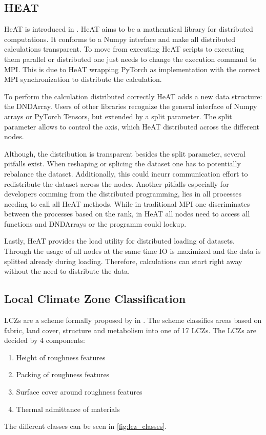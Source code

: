 \subsection{HEAT}
\label{subsec:heat}
\gls{HeAT} is introduced in \cite{krajsek_helmholtz_nodate}. HeAT aims to be a mathemtical library for distributed computations.
It conforms to a Numpy \cite{noauthor_numpy_nodate} interface and make all distributed calculations transparent. To move from executing \gls{HeAT} scripts to executing them parallel
or distributed one just needs to change the execution command to MPI.
This is due to \gls{HeAT} wrapping PyTorch as implementation with the correct \gls{MPI} synchronization to distribute the calculation.

To perform the calculation distributed correctly \gls{HeAT} adds a new data structure: the DNDArray. Users of other libraries
recognize the general interface of Numpy arrays or PyTorch Tensors, but extended by a split parameter.
The split parameter allows to control the axis, which \gls{HeAT} distributed across the different nodes.

Although, the distribution is transparent besides the split parameter, several pitfalls exist.
When reshaping or splicing the dataset one has to potentially rebalance the dataset. Additionally, this could incurr communication effort
to redistribute the dataset across the nodes.
Another pitfalls especially for developers comming from the distributed programming, lies in all processes needing to call all \gls{HeAT} methods.
While in traditional \gls{MPI} one discriminates between the processes based on the rank, in \gls{HeAT} all nodes need to access all functions and DNDArrays or the
programm could lockup.

Lastly, \gls{HeAT} provides the load utility for distributed loading of datasets. Through the usage of all nodes at the same time IO is maximized and the data
is splitted already during loading. Therefore, calculations can start right away without the need to distribute the data.
\cite{krajsek_helmholtz_nodate}


\subsection{Local Climate Zone Classification}
\label{subsec:local_climate_zone_classification}

\gls{LCZ}s are a scheme formally proposed by \citeauthor{stewart_local_2012} in \cite{stewart_local_2012}. The scheme classifies areas based on fabric, land cover, structure
and metabolism into one of 17 \gls{LCZ}s. \cite{xue_applications_2020}
The \gls{LCZ}s are decided by 4 components:
\begin{enumerate}
  \item Height of roughness features
  \item Packing of roughness features
  \item Surface cover around roughness features
  \item Thermal admittance of materials
\end{enumerate}
The different classes can be seen in \cref{fig:lcz_classes}.



